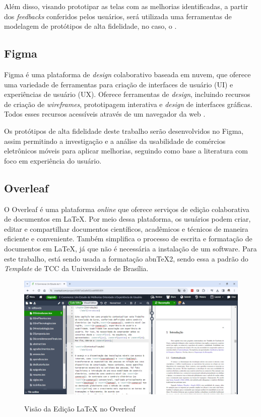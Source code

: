 Além disso, visando prototipar as telas com as melhorias identificadas, a partir dos \textit{feedbacks} conferidos pelos usuários, será utilizada uma ferramentas de modelagem de protótipos de alta fidelidade, no caso, o .


\subsection{Figma}
    \label{Figma}
    
Figma é uma plataforma de \textit{design} colaborativo baseada em nuvem, que oferece uma variedade de ferramentas para criação de interfaces de usuário (UI) e experiências de usuário (UX). Oferece ferramentas de \textit{design}, incluindo recursos de criação de \textit{wireframes}, prototipagem interativa e \textit{design} de interfaces gráficas. Todos esses recursos acessíveis através de um navegador da web \cite{Figma}.

Os protótipos de alta fidelidade deste trabalho serão desenvolvidos no Figma, assim permitindo a investigação e a análise da usabilidade de comércios eletrônicos móveis para aplicar melhorias, seguindo como base a literatura com foco em experiência do usuário.


\subsection{Overleaf}
    \label{Overleaf}
    
O Overleaf \cite{Overleaf} é uma plataforma \textit{online} que oferece serviços de edição colaborativa de documentos em LaTeX. Por meio dessa plataforma, os usuários podem criar, editar e compartilhar documentos científicos, acadêmicos e técnicos de maneira eficiente e conveniente. Também simplifica o processo de escrita e formatação de documentos em LaTeX, já que não é necessária a instalação de um software. Para este trabalho, está sendo usada a formatação abnTeX2, sendo essa a padrão do \textit{Template} de TCC da Universidade de Brasília.

\begin{figure}[ht]
    \centering
    \caption{Visão da Edição LaTeX no Overleaf}
    \includegraphics[keepaspectratio=true,scale=0.4]{figuras/cap03overleaf.png}
    \label{fig05}
\end{figure}


